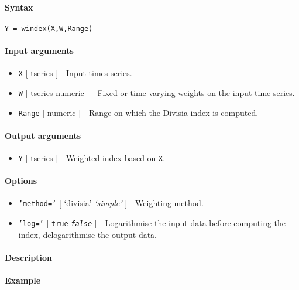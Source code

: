 


	\paragraph{Syntax}\label{syntax}

\begin{verbatim}
Y = windex(X,W,Range)
\end{verbatim}

\paragraph{Input arguments}\label{input-arguments}

\begin{itemize}
\item
  \texttt{X} {[} tseries {]} - Input times series.
\item
  \texttt{W} {[} tseries \textbar{} numeric {]} - Fixed or time-varying
  weights on the input time series.
\item
  \texttt{Range} {[} numeric {]} - Range on which the Divisia index is
  computed.
\end{itemize}

\paragraph{Output arguments}\label{output-arguments}

\begin{itemize}
\itemsep1pt\parskip0pt
\item
  \texttt{Y} {[} tseries {]} - Weighted index based on \texttt{X}.
\end{itemize}

\paragraph{Options}\label{options}

\begin{itemize}
\item
  \texttt{'method='} {[} `divisia' \textbar{} \emph{`simple'} {]} -
  Weighting method.
\item
  \texttt{'log='} {[} \texttt{true} \textbar{} \emph{\texttt{false}} {]}
  - Logarithmise the input data before computing the index,
  delogarithmise the output data.
\end{itemize}

\paragraph{Description}\label{description}

\paragraph{Example}\label{example}


